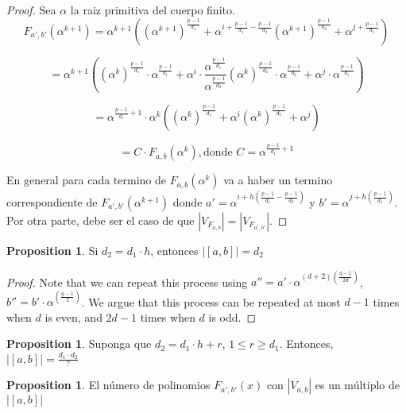 \documentclass{article}
\theoremstyle{definition}
\newtheorem{prop}[theorem]{Proposition}
\theoremstyle{remark}
\numberwithin{equation}{section}
\begin{document}
\begin{proof}
  
  Sea $\alpha$ la raiz primitiva del cuerpo finito. $$F_{a', b'}(\alpha^{k+1}) = \alpha^{k+1}((\alpha^{k+1})^{\frac{p-1}{d_1}} + \alpha^{i + \frac{p-1}{d_1} - \frac{p-1}{d_2}}(\alpha^{k+1})^{\frac{p-1}{d_2}} + \alpha^{j + \frac{p-1}{d_1}})$$

  $$= \alpha^{k+1}((\alpha^{k})^{\frac{p-1}{d_1}} \cdot \alpha^{\frac{p-1}{d_1}} + \alpha^{i} \cdot \frac{\alpha^{\frac{p-1}{d_1}}} {\alpha^{\frac{p-1}{d_2}}} (\alpha^{k})^{\frac{p-1}{d_2}} \cdot \alpha^{\frac{p-1}{d_2}} + \alpha^{j} \cdot \alpha^{\frac{p-1}{d_1}})$$

  $$= \alpha^{\frac{p-1}{d_1} + 1} \cdot \alpha^{k}((\alpha^{k})^{\frac{p-1}{d_1}} + \alpha^{i}(\alpha^{k})^{\frac{p-1}{d_2}} + \alpha^{j} )$$

  $$= C \cdot F_{a,b}(\alpha^k), \mbox{donde } C = \alpha^{\frac{p-1}{d_1} + 1}$$

  En general para cada termino de $F_{a,b}(\alpha^{k})$ va a haber un termino correspondiente de $F_{a',b'}(\alpha^{k+1})$ donde $a' = \alpha^{i + h(\frac{p-1}{d_1} - \frac{p-1}{d_2})}$ y $b'= \alpha^{j + h(\frac{p-1}{d_1})}$. Por otra parte, debe ser el caso de que $\left\vert V_{F_{a,b}} \right\vert = \left\vert V_{F_{a',b'}} \right\vert$.

\end{proof}

\begin{prop}
  
  Si $d_2 = d_1 \cdot h$, entonces $|[a, b]| = d_2$

\end{prop}

\begin{proof}
  Note that we can repeat this process using $a'' = a' \cdot \alpha^{(d+2)(\frac{q-1}{2d})}$, $b'' = b' \cdot \alpha^{(\frac{q-1}{2})}$. We argue that this process can be repeated at most $d-1$ times when $d$ is even, and $2d-1$ times when $d$ is odd.
\end{proof}

\begin{prop}
  
  Suponga que $d_2 = d_1 \cdot h + r$, $1 \leq r \geq d_1$. Entonces, $|[a, b]| = 
  \frac{d_1 \cdot d_2}{?}$

\end{prop}

\begin{prop}

  El n\'umero de polinomios $F_{a', b'}(x)$ con $|V_{a, b}|$ es un m\'ultiplo de $|[a, b]|$

\end{prop}

 
  
\end{document}
